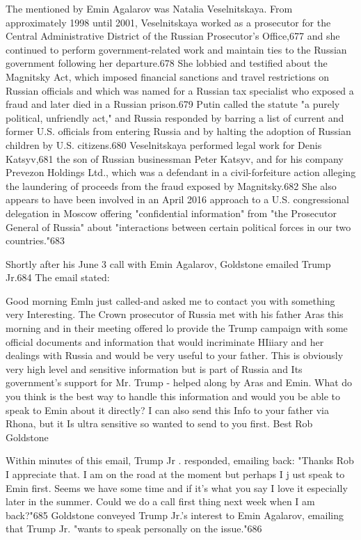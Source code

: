 The mentioned by Emin Agalarov was Natalia Veselnitskaya. From approximately 1998 until 2001, Veselnitskaya worked as a prosecutor for the Central Administrative District of the Russian Prosecutor's Office,677 and she continued to perform government-related work and maintain ties to the Russian government following her departure.678 She lobbied and testified about the Magnitsky Act, which imposed financial sanctions and travel restrictions on Russian officials and which was named for a  Russian tax specialist who exposed a  fraud and later died in a  Russian prison.679 Putin called the statute "a purely political, unfriendly act," and Russia responded by barring a  list of current and former U.S. officials from entering Russia and by halting the adoption of Russian children by U.S. citizens.680 Veselnitskaya performed legal work for Denis Katsyv,681 the son of Russian businessman Peter Katsyv, and for his company Prevezon Holdings Ltd., which was a defendant in a civil-forfeiture action alleging the laundering of proceeds from the fraud exposed by Magnitsky.682 She also appears to have been involved in an April 2016 approach to a  U.S. congressional delegation in Moscow offering "confidential information"  from "the Prosecutor General of Russia"  about "interactions between certain political forces in our two countries."683

Shortly after his June 3  call with Emin Agalarov, Goldstone emailed Trump Jr.684 The email stated:

Good morning Emln just called-and asked me to contact you with something very Interesting. The Crown prosecutor of Russia met with his father Aras this morning and in their meeting offered lo provide the Trump campaign with some official documents and information that would incriminate HIiiary and her dealings with Russia and would be very useful to your father. This is obviously very high level and sensitive information but is part of Russia and Its government's support for Mr. Trump - helped along by Aras and Emin. What do you think is the best way to handle this information and would you be able to speak to Emin about it directly? I can also send this Info to your father via Rhona, but it Is ultra sensitive so wanted to send to you first. Best Rob Goldstone

Within minutes of this email, Trump Jr . responded, emailing back: "Thanks Rob I appreciate that. I  am on the road at the moment but perhaps I j ust speak to Emin first. Seems we have some time and if it's what you say I love it especially later in the summer. Could we do a call first thing next week when I am back?"685 Goldstone conveyed Trump Jr.'s interest to Emin Agalarov, emailing that Trump Jr. "wants to speak personally on the issue."686

